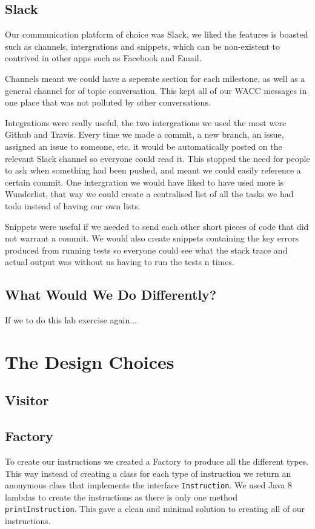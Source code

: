 \documentclass[11pt,a4paper]{article}
\begin{document}
\subsection{Slack}
\label{sub:Slack}
Our communication platform of choice was Slack, we liked the features is boasted such as channels, intergrations and snippets, which can be non-existent to contrived in other apps such as Facebook and Email.

Channels meant we could have a seperate section for each milestone, as well as a general channel for of topic conversation. This kept all of our WACC messages in one place that was not polluted by other conversations.

Integrations were really useful, the two intergrations we used the most were Github and Travis. Every time we made a commit, a new branch, an issue, assigned an issue to someone, etc. it would be automatically posted on the relevant Slack channel so everyone could read it. This stopped the need for people to ask when something had been pushed, and meant we could easily reference a certain commit. One intergration we would have liked to have used more is Wunderlist, that way we could create a centralised list of all the tasks we had todo instead of having our own lists.

Snippets were useful if we needed to send each other short pieces of code that did not warrant a commit. We would also create snippets containing the key errors produced from running tests so everyone could see what the stack trace and actual output was without us having to run the tests n times.

\subsection{What Would We Do Differently?}
\label{sub:What Would We Do Differently?}

If we to do this lab exercise again...

\section{The Design Choices}
\label{sec:The Design Choices}

\subsection{Visitor}
\label{sub:Visitor}


\subsection{Factory}
\label{sub:Factory}
To create our instructions we created a Factory to produce all the different types. This way instead of creating a class for each type of instruction we return an anonymous class that implements the interface \texttt{Instruction}. We used Java 8 lambdas to create the instructions as there is only one method \texttt{printInstruction}. This gave a clean and minimal solution to creating all of our instructions.
\end{document}
